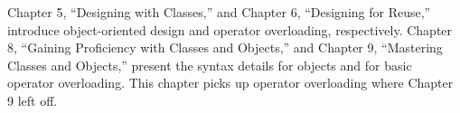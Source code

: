 Chapter 5, “Designing with Classes,” and Chapter 6, “Designing for Reuse,” introduce object-oriented design and operator overloading, respectively. Chapter 8, “Gaining Proficiency with Classes and Objects,” and Chapter 9, “Mastering Classes and Objects,” present the syntax details for objects and for basic operator overloading. This chapter picks up operator overloading where Chapter 9 left off.











